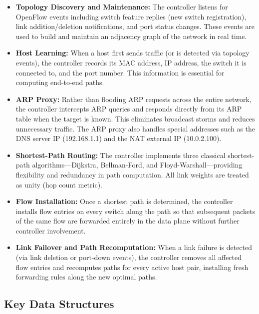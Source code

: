 \documentclass[12pt,a4paper]{article}
\begin{document}
\begin{itemize}[leftmargin=1.5cm]
    \item \textbf{Topology Discovery and Maintenance:} The controller listens for OpenFlow events including switch feature replies (new switch registration), link addition/deletion notifications, and port status changes. These events are used to build and maintain an adjacency graph of the network in real time.
    \item \textbf{Host Learning:} When a host first sends traffic (or is detected via topology events), the controller records its MAC address, IP address, the switch it is connected to, and the port number. This information is essential for computing end-to-end paths.
    \item \textbf{ARP Proxy:} Rather than flooding ARP requests across the entire network, the controller intercepts ARP queries and responds directly from its ARP table when the target is known. This eliminates broadcast storms and reduces unnecessary traffic. The ARP proxy also handles special addresses such as the DNS server IP (192.168.1.1) and the NAT external IP (10.0.2.100).
    \item \textbf{Shortest-Path Routing:} The controller implements three classical shortest-path algorithms---Dijkstra, Bellman-Ford, and Floyd-Warshall---providing flexibility and redundancy in path computation. All link weights are treated as unity (hop count metric).
    \item \textbf{Flow Installation:} Once a shortest path is determined, the controller installs flow entries on every switch along the path so that subsequent packets of the same flow are forwarded entirely in the data plane without further controller involvement.
    \item \textbf{Link Failover and Path Recomputation:} When a link failure is detected (via link deletion or port-down events), the controller removes all affected flow entries and recomputes paths for every active host pair, installing fresh forwarding rules along the new optimal paths.
\end{itemize}

\subsection{Key Data Structures}
\end{document}

